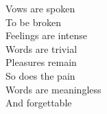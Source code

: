 Vows are spoken \\
To be broken \\
Feelings are intense \\
Words are trivial \\

Pleasures remain \\
So does the pain \\
Words are meaningless \\
And forgettable \\
